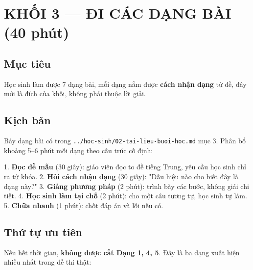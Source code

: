 \documentclass[11pt, a4paper]{article}
\begin{document}
\section{KHỐI 3 — ĐI CÁC DẠNG BÀI (40 phút)}

\subsection{Mục tiêu}

Học sinh làm được 7 dạng bài, mỗi dạng nắm được \textbf{cách nhận dạng} từ đề, đây mới là đích của khối, không phải thuộc lời giải.

\subsection{Kịch bản}

Bảy dạng bài có trong \texttt{../hoc-sinh/02-tai-lieu-buoi-hoc.md} mục 3. Phân bổ khoảng 5–6 phút mỗi dạng theo cấu trúc cố định:

1. \textbf{Đọc đề mẫu} (30 giây): giáo viên đọc to đề tiếng Trung, yêu cầu học sinh chỉ ra từ khóa.
2. \textbf{Hỏi cách nhận dạng} (30 giây): "Dấu hiệu nào cho biết đây là dạng này?"
3. \textbf{Giảng phương pháp} (2 phút): trình bày các bước, không giải chi tiết.
4. \textbf{Học sinh làm tại chỗ} (2 phút): cho một câu tương tự, học sinh tự làm.
5. \textbf{Chữa nhanh} (1 phút): chốt đáp án và lỗi nếu có.

\subsection{Thứ tự ưu tiên}

Nếu hết thời gian, \textbf{không được cắt Dạng 1, 4, 5}. Đây là ba dạng xuất hiện nhiều nhất trong đề thi thật:

\end{document}
